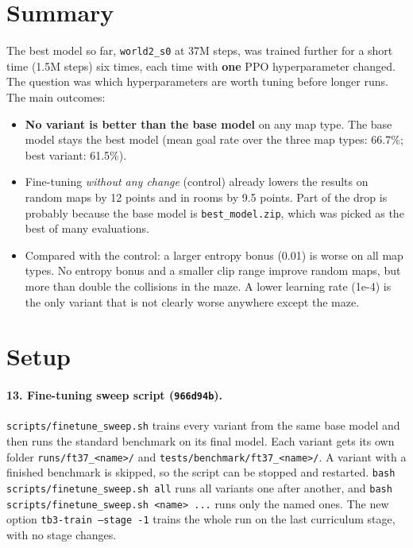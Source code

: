 \documentclass[11pt,a4paper]{article}
\newcommand{\code}[1]{\texttt{#1}}
\begin{document}
\section{Summary}
The best model so far, \code{world2\_s0} at 37M steps, was trained further for
a short time (1.5M steps) six times, each time with \textbf{one} PPO
hyperparameter changed. The question was which hyperparameters are worth
tuning before longer runs. The main outcomes:
\begin{itemize}[leftmargin=*]
      \item \textbf{No variant is better than the base model} on any map type.
            The base model stays the best model (mean goal rate over the three map
            types: 66.7\%; best variant: 61.5\%).
      \item Fine-tuning \emph{without any change} (control) already lowers the
            results on random maps by 12 points and in rooms by 9.5 points. Part of the
            drop is probably because the base model is \code{best\_model.zip}, which was
            picked as the best of many evaluations.
      \item Compared with the control: a larger entropy bonus (0.01) is worse on all
            map types. No entropy bonus and a smaller clip range improve random maps,
            but more than double the collisions in the maze. A lower learning rate
            (1e-4) is the only variant that is not clearly worse anywhere except the maze.
\end{itemize}

\section{Setup}

\paragraph{13. Fine-tuning sweep script (\code{966d94b}).}
\code{scripts/finetune\_sweep.sh} trains every variant from the same
base model and then runs the standard benchmark on its final model. Each
variant gets its own folder \code{runs/ft37\_<name>/} and
\code{tests/benchmark/ft37\_<name>/}. A variant with a finished benchmark is
skipped, so the script can be stopped and restarted.
\code{bash scripts/finetune\_sweep.sh all} runs all variants one after another,
and \code{bash scripts/finetune\_sweep.sh <name> ...} runs only the named ones.
The new option \code{tb3-train --stage -1} trains the whole run on the last
curriculum stage, with no stage changes.
\end{document}
